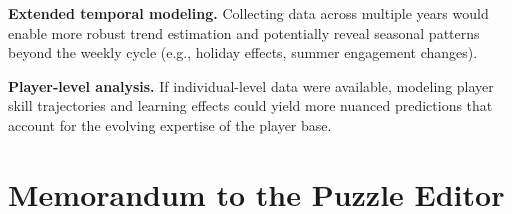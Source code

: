 \documentclass{mcmthesis}
\begin{document}
\textbf{Extended temporal modeling.} Collecting data across multiple years would enable more robust trend estimation and potentially reveal seasonal patterns beyond the weekly cycle (e.g., holiday effects, summer engagement changes).

\textbf{Player-level analysis.} If individual-level data were available, modeling player skill trajectories and learning effects could yield more nuanced predictions that account for the evolving expertise of the player base.

\section{Memorandum to the Puzzle Editor}
\end{document}
